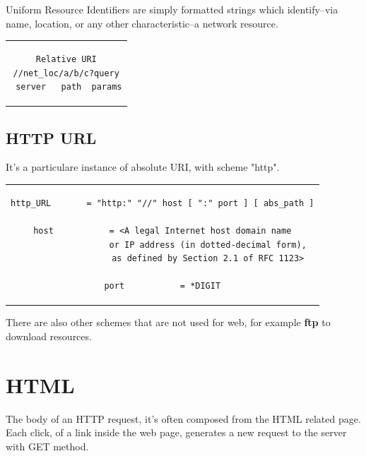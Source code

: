 Uniform Resource Identifiers are simply formatted strings which identify--via name, location, or any other characteristic--a network resource. 
\begin{center}
\begin{tabular}{c}
\begin{lstlisting}[linewidth=320pt, basicstyle=\footnotesize\sffamily,]
Relative URI
//net_loc/a/b/c?query
 server   path  params
\end{lstlisting}
\end{tabular}
\end{center}

\subsection{HTTP URL}
It's a particulare instance of absolute URI, with scheme "http".
\begin{center}
\begin{tabular}{c}
\begin{lstlisting}[linewidth=320pt, basicstyle=\footnotesize\sffamily,]
http_URL       = "http:" "//" host [ ":" port ] [ abs_path ]

host           = <A legal Internet host domain name
                  or IP address (in dotted-decimal form),
                  as defined by Section 2.1 of RFC 1123>

port           = *DIGIT
\end{lstlisting}
\end{tabular}
\end{center}
There are also other schemes that are not used for web, for example \textbf{ftp} to download resources.
\section{HTML}
The body of an HTTP request, it's often composed from the HTML related page. Each click, of a link inside the web page, generates a new request to the server with GET method.

